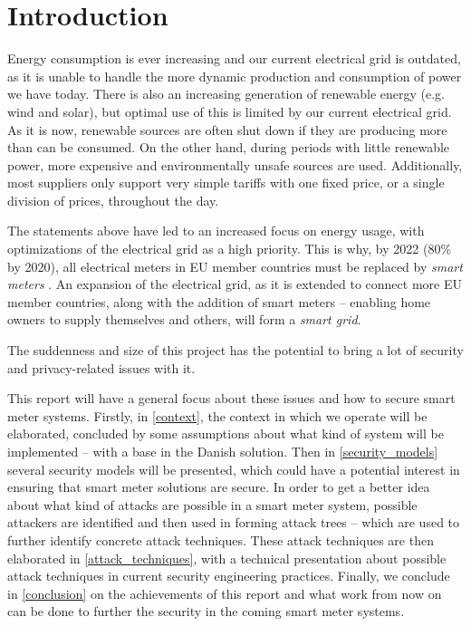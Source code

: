 
\chapter*{Introduction}

Energy consumption is ever increasing and our current electrical grid is outdated, as it is unable to handle the more dynamic production and consumption of power we have today.
There is also an increasing generation of renewable energy (e.g. wind and solar), but optimal use of this is limited by our current electrical grid.
As it is now, renewable sources are often shut down if they are producing more than can be consumed.
On the other hand, during periods with little renewable power, more expensive and environmentally unsafe sources are used.
Additionally, most suppliers only support very simple tariffs with one fixed price, or a single division of prices, throughout the day.

The statements above have led to an increased focus on energy usage, with optimizations of the electrical grid as a high priority.
This is why, by 2022 (80\% by 2020), all  electrical meters in EU member countries must be replaced by \emph{smart meters} \cite{smart_meter_survey, directive_2009_72_EC}.
An expansion of the electrical grid, as it is extended to connect more EU member countries, along with the addition of smart meters -- enabling home owners to supply themselves and others, will form a \emph{smart grid}.

The suddenness and size of this project has the potential to bring a lot of security and privacy-related issues with it.

This report will have a general focus about these issues and how to secure smart meter systems.
Firstly, in \cref{context}, the context in which we operate will be elaborated, concluded by some assumptions about what kind of system will be implemented -- with a base in the Danish solution.
Then in \cref{security_models} several security models will be presented, which could have a potential interest in ensuring that smart meter solutions are secure.
In order to get a better idea about what kind of attacks are possible in a smart meter system, possible attackers are identified and then used in forming attack trees -- which are used to further identify concrete attack techniques.
These attack techniques are then elaborated in \cref{attack_techniques}, with a technical presentation about possible attack techniques in current security engineering practices.
Finally, we conclude in \cref{conclusion} on the achievements of this report and what work from now on can be done to further the security in the coming smart meter systems.
